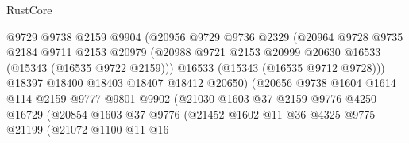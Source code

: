 \begin{lexlean}{RustCore}
\begin{coremodule}
                                @9729
                                @9738
                                @2159
                                @9904
                                (@20956
                                  @9729
                                  @9736
                                  @2329
                                  (@20964
                                    @9728
                                    @9735
                                    @2184
                                    @9711
                                    @2153
                                    @20979
                                    (@20988
                                      @9721
                                      @2153
                                      @20999
                                      @20630
                                      @16533
                                      (@15343 (@16535 @9722 @2159)))
                                    @16533
                                    (@15343 (@16535 @9712 @9728)))
                                  @18397
                                  @18400
                                  @18403
                                  @18407
                                  @18412
                                  @20650)
                                (@20656
                                  @9738
                                  @1604
                                  @1614
                                  @114
                                  @2159
                                  @9777
                                  @9801
                                  @9902
                                  (@21030
                                    @1603
                                    @37
                                    @2159
                                    @9776
                                    @4250
                                    @16729
                                    (@20854
                                      @1603
                                      @37
                                      @9776
                                      (@21452
                                        @1602
                                        @11
                                        @36
                                        @4325
                                        @9775
                                        @21199
                                        (@21072
                                          @1100
                                          @11
                                          @16

\end{coremodule}
\end{lexlean}

